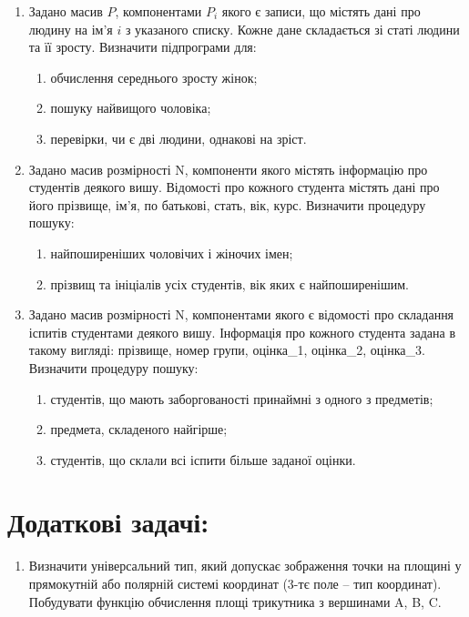 \documentclass[a5paper,titlepage,openany,twoside,draft]{book_unv}%
\makeatletter
\newcommand{\xslalph}[1]{\expandafter\@xslalph\csname c@#1\endcsname}
\newcommand{\@xslalph}[1]{%
    \ifcase#1\or а\or б\or в\or г\or д\or e\or є\or ж\or з\or i%
    \or й\or к\or л\or м\or н\or о\or п\or р\or с\or т%
    \or у\or ф\or х\or ц\or ч\or ш\or ю\or я\or аа\or бб\or вв%
    \else\@ctrerr\fi%
}
\makeatother
\begin{document}
\begin{enumerate}
\item
  Задано масив $P$, компонентами $P_i$ якого є записи, що містять дані про
  людину на ім'я $i$ з указаного списку. Кожне дане складається зі статі
  людини та її зросту. Визначити підпрограми для:
\begin{enumerate}[label=\xslalph*)]
\item обчислення середнього зросту жінок;
\item пошуку найвищого чоловіка;
\item перевірки, чи є дві людини, однакові на зріст.
\end{enumerate}

\item
  Задано масив розмірності N, компоненти якого містять інформацію про
  студентів деякого вишу. Відомості про кожного студента містять дані
  про його прізвище, ім'я, по батькові, стать, вік, курс. Визначити
  процедуру пошуку:
\begin{enumerate}[label=\xslalph*)]
\item найпоширеніших чоловічих і жіночих імен;
\item прізвищ та ініціалів усіх студентів, вік яких є найпоширенішим.
\end{enumerate}

\item
  Задано масив розмірності N, компонентами якого є відомості про
  складання іспитів студентами деякого вишу. Інформація про кожного
  студента задана в такому вигляді: прізвище, номер групи, оцінка\_1,
  оцінка\_2, оцінка\_3. Визначити процедуру пошуку:
\begin{enumerate}[label=\xslalph*)]
\item студентів, що мають заборгованості принаймні з одного з предметів;
\item предмета, складеного найгірше;
\item студентів, що склали всі іспити більше заданої оцінки.
\end{enumerate}

\end{enumerate}

\section{Додаткові задачі:}

\begin{enumerate}
\def\labelenumi{\arabic{enumi})}
\setcounter{enumi}{17}
\item
  Визначити універсальний тип, який допускає зображення точки на площині
  у прямокутній або полярній системі координат (3-тє поле -- тип
  координат). Побудувати функцію обчислення площі трикутника з вершинами
  A, B, C.
\end{enumerate}
\end{document}
